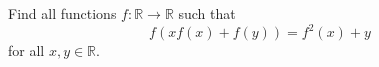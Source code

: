 Find all functions $f: \mathbb R \to \mathbb R$ such that \[ f( xf(x) + f(y) ) = f^2(x) + y \] for all $x,y\in \mathbb R$.